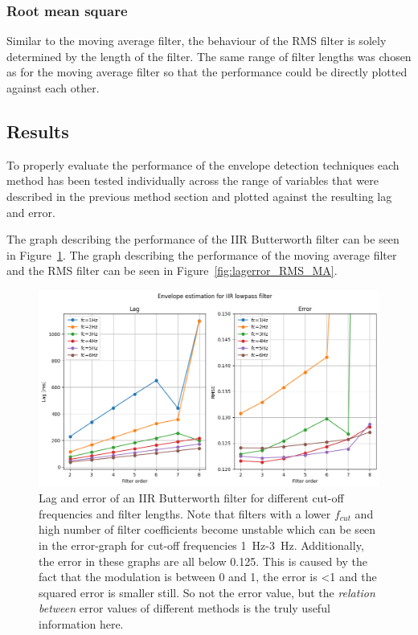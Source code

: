 \subsubsection{Root mean square}
Similar to the moving average filter, the behaviour of the RMS filter is solely determined by the length of the filter. The same range of filter lengths was chosen as for the moving average filter so that the performance could be directly plotted against each other.

\subsection{Results}
To properly evaluate the performance of the envelope detection techniques each method has been tested individually across the range of variables that were described in the previous method section and plotted against the resulting lag and error. 

The graph describing the performance of the IIR Butterworth filter can be seen in Figure~\ref{fig:lagerror_iir}. The graph describing the performance of the moving average filter and the RMS filter can be seen in Figure~\ref{fig:lagerror_RMS_MA}.

\begin{figure}[h!t]
	\begin{center}
		\includegraphics[width=1.0\columnwidth]{images/lagerror_iirfilter.png}
	\end{center}
	\caption{Lag and error of an IIR Butterworth filter for different cut-off frequencies and filter lengths. Note that filters with a lower $f_{cut}$ and high number of filter coefficients become unstable which can be seen in the error-graph for cut-off frequencies \SI{1}{\hertz}-\SI{3}{\hertz}. Additionally, the error in these graphs are all below 0.125. This is caused by the fact that the modulation is between 0 and 1, the error is <1 and the squared error is smaller still. So not the error value, but the \textit{relation between} error values of different methods is the truly useful information here.}
	\label{fig:lagerror_iir}
\end{figure}

